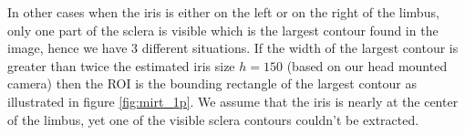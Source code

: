 \documentclass[12pt,fleqn]{book} %
\begin{document}
\begin{figure}[h]
\end{figure}

In other cases when the iris is either on the left or on the right of the limbus, only one part of the sclera is visible which is the largest contour found in the image, hence we have 3 different situations. If the width of the largest contour is greater than twice the estimated iris size $ h = 150 $ (based on our head mounted camera) then the ROI is the bounding rectangle of the largest contour as illustrated in figure \ref{fig:mirt_1p}. We assume that the iris is nearly at the center of the limbus, yet one of the visible sclera contours couldn't be extracted. \bigskip
\end{document}
